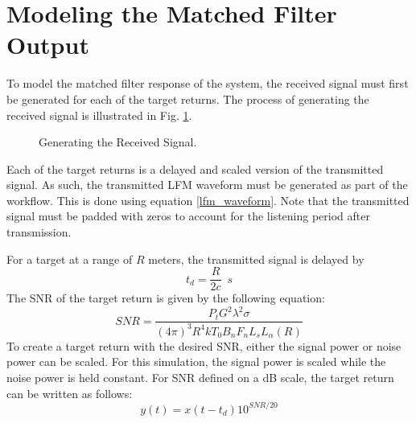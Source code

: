 \documentclass[conference]{IEEEtran}
\begin{document}
\section{Modeling the Matched Filter Output}
To model the matched filter response of the system, the received signal must first be generated for each of the target returns. The process of generating the received signal is illustrated in Fig. \ref{gen_rx_sig}.
\begin{figure}[H]
\centerline{}
\caption{Generating the Received Signal.}
\label{gen_rx_sig}
\end{figure}
Each of the target returns is a delayed and scaled version of the transmitted signal. As such, the transmitted LFM waveform must be generated as part of the workflow. This is done using equation \eqref{lfm_waveform}. Note that the transmitted signal must be padded with zeros to account for the listening period after transmission.
\par
For a target at a range of $R$ meters, the transmitted signal is delayed by
\begin{equation}
t_d = \frac{R}{2c} \enspace s
\end{equation}
The SNR of the target return is given by the following equation:
\begin{equation}
SNR = \frac{P_t G^2 \lambda^2 \sigma}{(4\pi)^3 R^4 k T_0 B_n F_n L_s L_\alpha(R)}
\end{equation}
To create a target return with the desired SNR, either the signal power or noise power can be scaled. For this simulation, the signal power is scaled while the noise power is held constant. For SNR defined on a dB scale, the target return can be written as follows:
\begin{equation}
y(t) = x(t-t_d)10^{SNR/20}
\end{equation}
\end{document}
